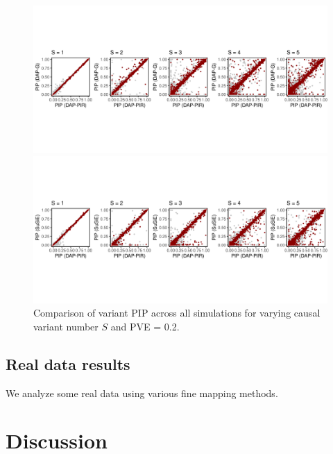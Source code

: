 \documentclass[pdflatex,sn-mathphys-num]{sn-jnl}%
\theoremstyle{thmstyleone}%
\theoremstyle{thmstyletwo}%
\theoremstyle{thmstylethree}%
\begin{document}
\begin{figure}[H]
    \centering
    \begin{minipage}{\textwidth}
        \centering
        \includegraphics[width=\textwidth,trim={0cm 2cm 0cm 2cm}, clip]{files/plot_pip_dap.png}
        \vspace{-1cm} %
    \end{minipage}
    \begin{minipage}{\textwidth}
        \centering
        \includegraphics[width=\textwidth, trim={0cm 2cm 0cm 2cm}, clip]{files/plot_pip_susie.png}
    \end{minipage}
    \caption{Comparison of variant PIP across all simulations for varying causal variant number $S$ and PVE = 0.2.}
    \label{fig:power}
\end{figure}


\subsection{Real data results}\label{subsec4}
We analyze some real data using various fine mapping methods.

\section{Discussion}\label{sec3}
\end{document}
